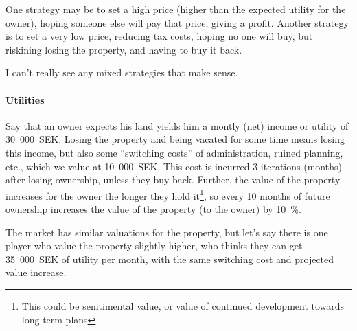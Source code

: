 \documentclass{article}
\begin{document}
One strategy may be to set a high price (higher than the expected utility for
the owner), hoping someone else will pay that price, giving a profit. Another
strategy is to set a very low price, reducing tax costs, hoping no one will buy,
but riskining losing the property, and having to buy it back.

I can't really see any mixed strategies that make sense.

\paragraph{Utilities}
Say that an owner expects his land yields him a montly (net) income or utility of
30~000~SEK. Losing the property and being vacated for some time means losing this income, but also
some ``switching costs'' of administration, ruined planning, etc., which we
value at 10~000~SEK. This cost is incurred 3 iterations (months) after losing
ownership, unless they buy back. Further, the value of the property increases for the owner
the longer they hold it\footnote{This could be senitimental value, or value of
  continued development towards long term plans}, so every 10 months of future ownership increases the
value of the property (to the owner) by 10~\%.

The market has similar valuations for the property, but let's say there is one
player who value the property slightly higher, who thinks they can get
35~000~SEK of utility per month, with the same switching cost and projected
value increase.
\end{document}
